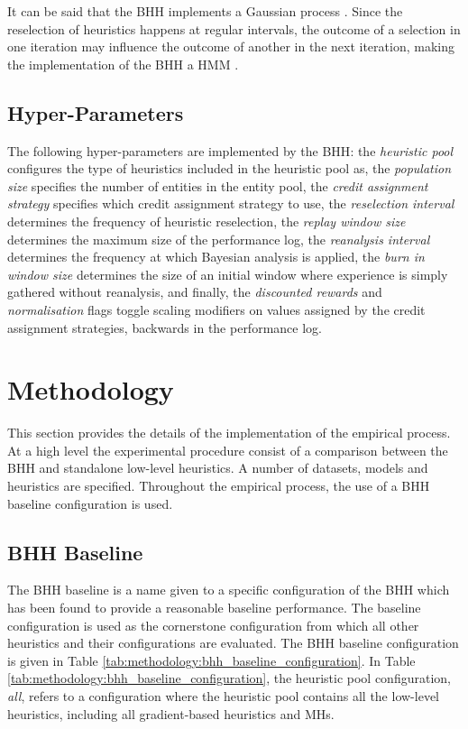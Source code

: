 \documentclass[preprint,review,12pt]{elsarticle}
\begin{document}
It can be said that the \acs{BHH} implements a Gaussian process \citep{ref:gortler:2019}. Since the reselection of heuristics happens at regular intervals, the outcome of a selection in one iteration may influence the outcome of another in the next iteration, making the implementation of the \acs{BHH} a \acf{HMM} \citep{ref:rabiner:1986}.


\subsection{Hyper-Parameters}\label{sec:bhh:hyper_parameters}

The following hyper-parameters are implemented by the \acs{BHH}: the \textit{heuristic pool} configures the type of heuristics included in the heuristic pool as, the \textit{population size} specifies the number of entities in the entity pool, the \textit{credit assignment strategy} specifies which credit assignment strategy to use, the \textit{reselection interval} determines the frequency of heuristic reselection, the \textit{replay window size} determines the maximum size of the performance log, the \textit{reanalysis interval} determines the frequency at which Bayesian analysis is applied, the \textit{burn in window size} determines the size of an initial window where experience is simply gathered without reanalysis, and finally, the \textit{discounted rewards} and \textit{normalisation} flags toggle scaling modifiers on values assigned by the credit assignment strategies, backwards in the performance log.



\section{Methodology}
\label{sec:methodology}

This section provides the details of the implementation of the empirical process. At a high level the experimental procedure consist of a comparison between the \acs{BHH} and standalone low-level heuristics. A number of datasets, models and heuristics are specified. Throughout the empirical process, the use of a \acs{BHH} baseline configuration is used.

\subsection{BHH Baseline}\label{sec:methodology:baseline_bhh}

The \acs{BHH} baseline is a name given to a specific configuration of the \acs{BHH} which has been found to provide a reasonable baseline performance. The baseline configuration is used as the cornerstone configuration from which all other heuristics and their configurations are evaluated. The \acs{BHH} baseline configuration is given in Table \ref{tab:methodology:bhh_baseline_configuration}. In Table \ref{tab:methodology:bhh_baseline_configuration}, the heuristic pool configuration, \textit{all}, refers to a configuration where the heuristic pool contains all the low-level heuristics, including all gradient-based heuristics and \acp{MH}.
\end{document}
